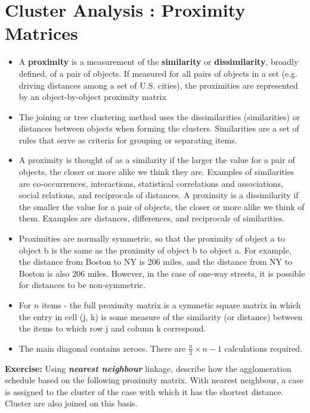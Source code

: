 \documentclass[a4paper,12pt]{report}
\begin{document}
\section{Cluster Analysis : Proximity Matrices}
\begin{itemize}
\item A \textbf{proximity} is a measurement of the \textbf{similarity} or \textbf{dissimilarity}, broadly defined, of a pair of objects. If measured for all pairs of objects in a set (e.g. driving distances among a set of U.S. cities), the proximities are represented by an object-by-object proximity matrix

\item 
The joining or tree clustering method uses the dissimilarities (similarities) or distances between objects when forming the clusters. Similarities are a set of rules that serve as criteria for grouping or separating items. 

\item A proximity is thought of as a similarity if the larger the value for a pair of objects, the closer or more alike we think they are. Examples of similarities are co-occurrences, interactions, statistical correlations and associations, social relations, and reciprocals of distances. A proximity is a dissimilarity if the smaller the value for a pair of objects, the closer or more alike we think of them. Examples are distances, differences, and reciprocals of similarities. 

\item Proximities are normally symmetric, so that the proximity of object a to object b is the same as the proximity of object b to object a. For example, the distance from Boston to NY is 206 miles, and the distance from NY to Boston is also 206 miles. However, in the case of one-way streets, it is possible for distances to be non-symmetric. 



\item For $n$ items - the full proximity matrix is a symmetic square matrix in which the entry in cell (j, k) is some measure of the similarity (or distance) between the items to which row j and column k correspond.

\item The main diagonal contains zeroes. There are $\displaystyle \frac{n}{2} \times n-1$ calculations required.
\end{itemize}
\smallskip


\noindent \textbf{Exercise:} Using \textbf{\textit{nearest neighbour}} linkage, describe how the agglomeration schedule based on the following 
proximity matrix. With nearest neighbour, a case is assigned to the cluster of the case with which it has the shortest distance. Cluster are also joined on this basis.
\end{document}
